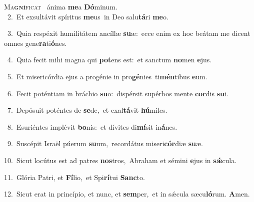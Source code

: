 \lettrine{\initial\textcolor{\initialcolor}{M}}{a\-\textbf{gní}\-ficat~\star} ánima \textbf{me}\-a \textbf{Dó}\-minum.\\
{\numbfont\textcolor{\numbcolor}{~2.}}~Et exsultávit spíritus \textbf{me}\-us~\star in Deo salu\-\textbf{tá}\-ri \textbf{me}\-o.\par
{\numbfont\textcolor{\numbcolor}{~3.}}~Quia respéxit humilitátem ancíllæ \textbf{su}\-æ:~\star ecce enim ex hoc beátam me dicent omnes gene\-\textbf{ra}\-ti\-\textbf{ó}\-nes.\par
{\numbfont\textcolor{\numbcolor}{~4.}}~Quia fecit mihi magna qui \textbf{pot}\-ens est:~\star et sanctum \textbf{no}\-men \textbf{e}\-jus.\par
{\numbfont\textcolor{\numbcolor}{~5.}}~Et misericórdia ejus a progénie in pro\-\textbf{gé}\-nies~\star ti\-\textbf{mén}\-tibus \textbf{e}\-um.\par
{\numbfont\textcolor{\numbcolor}{~6.}}~Fecit poténtiam in bráchio \textbf{su}\-o:~\star dispérsit supérbos mente \textbf{cor}\-dis \textbf{su}\-i.\par
{\numbfont\textcolor{\numbcolor}{~7.}}~Depósuit poténtes de \textbf{se}\-de,~\star et exal\-\textbf{tá}\-vit \textbf{hú}\-miles.\par
{\numbfont\textcolor{\numbcolor}{~8.}}~Esuriéntes implévit \textbf{bo}\-nis:~\star et dívites di\-\textbf{mí}\-sit in\-\textbf{á}\-nes.\par
{\numbfont\textcolor{\numbcolor}{~9.}}~Suscépit Israël púerum \textbf{su}\-um,~\star recordátus miseri\-\textbf{cór}\-diæ \textbf{su}\-æ.\par
{\numbfont\textcolor{\numbcolor}{10.}}~Sicut locútus est ad patres \textbf{nos}\-tros,~\star Abraham et sémini \textbf{e}\-jus in \textbf{sǽ}\-cula.\par
{\numbfont\textcolor{\numbcolor}{11.}}~Glória Patri, et \textbf{Fí}\-lio,~\star et Spi\-\textbf{rí}\-tui \textbf{Sanc}\-to.\par
{\numbfont\textcolor{\numbcolor}{12.}}~Sicut erat in princípio, et nunc, et \textbf{sem}\-per,~\star et in sǽcula sæcu\-\textbf{ló}\-rum. \textbf{A}\-men.\par
